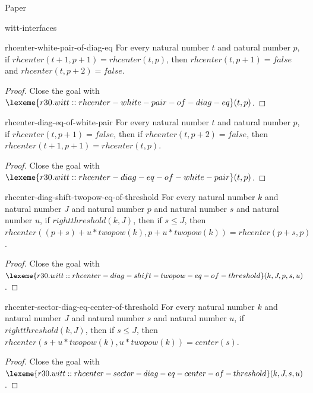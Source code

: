\begin{lexlean}{Paper}
\begin{section}{witt-interfaces}
  \begin{theorem}{rhcenter-white-pair-of-diag-eq}
  For every natural number \(t\) and natural number \(p\), if \(rhcenter(t + 1, p + 1) = rhcenter(t, p)\), then \(rhcenter(t, p + 1) = false\) and \(rhcenter(t, p + 2) = false\).
  \begin{proof}
  Close the goal with \(\lexeme{r30.witt::rhcenter-white-pair-of-diag-eq}(t, p)\).
  \end{proof}
  \end{theorem}

  \begin{theorem}{rhcenter-diag-eq-of-white-pair}
  For every natural number \(t\) and natural number \(p\), if \(rhcenter(t, p + 1) = false\), then if \(rhcenter(t, p + 2) = false\), then \(rhcenter(t + 1, p + 1) = rhcenter(t, p)\).
  \begin{proof}
  Close the goal with \(\lexeme{r30.witt::rhcenter-diag-eq-of-white-pair}(t, p)\).
  \end{proof}
  \end{theorem}

  \begin{theorem}{rhcenter-diag-shift-twopow-eq-of-threshold}
  For every natural number \(k\) and natural number \(J\) and natural number \(p\) and natural number \(s\) and natural number \(u\), if \(rightthreshold(k, J)\), then if \(s ≤ J\), then \(rhcenter((p + s) + u * twopow(k), p + u * twopow(k)) = rhcenter(p + s, p)\).
  \begin{proof}
  Close the goal with \(\lexeme{r30.witt::rhcenter-diag-shift-twopow-eq-of-threshold}(k, J, p, s, u)\).
  \end{proof}
  \end{theorem}

  \begin{theorem}{rhcenter-sector-diag-eq-center-of-threshold}
  For every natural number \(k\) and natural number \(J\) and natural number \(s\) and natural number \(u\), if \(rightthreshold(k, J)\), then if \(s ≤ J\), then \(rhcenter(s + u * twopow(k), u * twopow(k)) = center(s)\).
  \begin{proof}
  Close the goal with \(\lexeme{r30.witt::rhcenter-sector-diag-eq-center-of-threshold}(k, J, s, u)\).
  \end{proof}
  \end{theorem}


\end{section}
\end{lexlean}

